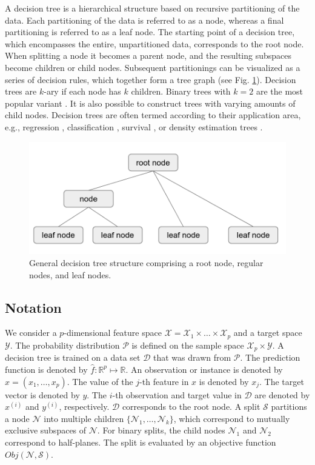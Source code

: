 \documentclass[a4paper, 11pt]{article}
\newcommand{\Data}{\mathcal{D}}
\newcommand{\Node}{\mathcal{N}}
\newcommand{\Split}{\mathcal{S}}
\begin{document}
A decision tree is a hierarchical structure based on recursive partitioning of the data. Each partitioning of the data is referred to as a node, whereas a final partitioning is referred to as a leaf node. The starting point of a decision tree, which encompasses the entire, unpartitioned data, corresponds to the root node. 
When splitting a node it becomes a parent node, and the resulting subspaces become children or child nodes. Subsequent partitionings can be visualized as a series of decision rules, which together form a tree graph (see Fig. \ref{fig:tree_structure}). Decision trees are $k$-ary if each node has $k$ children.
Binary trees with $k = 2$ are the most popular variant \cite{hastie_elemstatlearn}. It is also possible to construct trees with varying amounts of child nodes. Decision trees are often termed according to their application area, e.g., regression \cite{cart_1}, classification \cite{quinlan_c45, cart_1, kass_chaid}, survival \cite{derose_survival_tree}, or density estimation trees \cite{ram_density_estimation_tree}.

\begin{figure}
    \centering
    \includegraphics[width = 0.6 \linewidth]{thesis/figure/tree_structure.png}
    \caption{General decision tree structure comprising a root node, regular nodes, and leaf nodes.}
    \label{fig:tree_structure}
\end{figure}

\subsection{Notation}

We consider a $p$-dimensional feature space $\mathcal{X} = \mathcal{X}_1 \times \dots \times \mathcal{X}_p$ and a target space $\mathcal{Y}$. The probability distribution $\mathcal{P}$ is defined on the sample space $\mathcal{X}_p \times \mathcal{Y}$. A decision tree is trained on a data set $\mathcal{D}$ that was drawn from $\mathcal{P}$. The prediction function is denoted by $\widehat{f}: \mathbb{R}^p \mapsto \mathbb{R}$. An observation or instance is denoted by $x = (x_1, \dots, x_p)$. The value of the $j$-th feature in $x$ is denoted by $x_j$. The target vector is denoted by $y$. The 
$i$-th observation and target value in $\Data$ are denoted by $x^{(i)}$ and $y^{(i)}$, respectively. $\Data$ corresponds to the root node. A split $\Split$ partitions a node $\Node$ into multiple 
children $\{\Node_1, \dots, \Node_k\}$, which correspond to mutually exclusive subspaces of $\Node$.  For binary splits, the child nodes $\Node_1$ and $\Node_2$ correspond to half-planes. The split is evaluated by an objective function $Obj(\Node, \Split)$.
\end{document}
